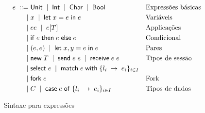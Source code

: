 \begin{figure}[ht]
  \begin{align*}
    e \; ::= \; & \mathsf{Unit} \;\mid\; \mathsf{Int} \;\mid\; \mathsf{Char} \;\mid\; \mathsf{Bool} && \text{Expressões básicas}\\
    \;\mid\; & x \;\mid\; \mathsf{let} \; x = e \; \mathsf{in} \; e && \text{Variáveis}\\
    \;\mid\; & ee \;\mid\; e[T] && \text{Applicações}\\
    \;\mid\; & \mathsf{if}\;e\;\mathsf{then}\;e\;\mathsf{else} \; e && \text{Condicional}\\
    \;\mid\; & (e,e) \;\mid\; \mathsf{let}\;x, y = e\;\mathsf{in}\;e && \text{Pares}\\
    \;\mid\; & \mathsf{new}\;T \;\mid\; \mathsf{send}\;e\; e \;\mid\; \mathsf{receive}\;e\; e && \text{Tipos de sessão}\\
    \;\mid\; & \mathsf{select}\;e \;\mid\; \mathsf{match}\;e\;\mathsf{with}\;\{l_i\;\to\;e_i\}_{i\in I} \\
    \;\mid\; & \mathsf{fork}\;e  && \text{Fork}\\
    \;\mid\; & C \;\mid\; \mathsf{case}\;e\;\mathsf{of}\;\{l_i\;\to\;e_i\}_{i\in I} && \text{Tipos de dados}\\
  \end{align*}
  \hrulefill
  \caption{Sintaxe para expressões}
  \label{fig:expressions}
\end{figure}


